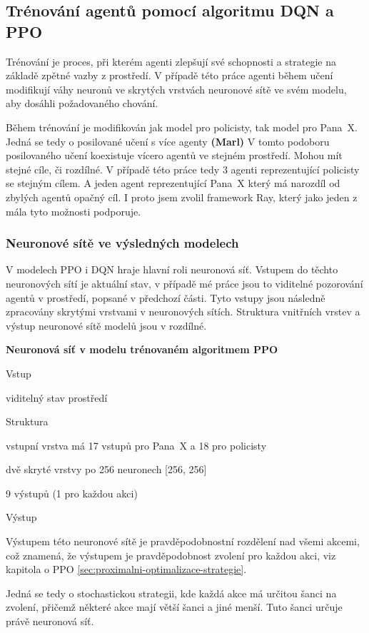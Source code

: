 \subsection{Trénování agentů pomocí algoritmu DQN a PPO}
Trénování je proces, při kterém agenti zlepšují své schopnosti a strategie na základě zpětné vazby z prostředí.
V případě této práce agenti během učení modifikují váhy neuronů ve skrytých vrstvách neuronové sítě ve svém modelu, aby dosáhli požadovaného chování.

Během trénování je modifikován jak model pro policisty, tak model pro Pana~X\@.
Jedná se tedy o posilované učení s více agenty \textbf{(Marl)}
V tomto podoboru posilovaného učení koexistuje vícero agentů ve stejném prostředí.
Mohou mít stejné cíle, či rozdílné.
V případě této práce tedy 3 agenti reprezentující policisty se stejným cílem.
A jeden agent reprezentující Pana~X který má narozdíl od zbylých agentů opačný cíl.
I proto jsem zvolil framework Ray, který jako jeden z mála tyto možnosti podporuje.

\subsubsection{Neuronové sítě ve výsledných modelech}
V modelech PPO i DQN hraje hlavní roli neuronová síť.
Vstupem do těchto neuronových sítí je aktuální stav, v případě mé práce jsou to viditelné pozorování agentů v prostředí, popsané v předchozí části.
Tyto vstupy jsou následně zpracovány skrytými vrstvami v neuronových sítích.
Struktura vnitřních vrstev a výstup neuronové sítě modelů jsou v rozdílné.
\bigskip

  \textbf{Neuronová síť v modelu trénovaném algoritmem PPO}
    \begin{myitemize}
      \item Vstup
        \begin{myitemize}
          \item viditelný stav prostředí
        \end{myitemize}
      \item Struktura
        \begin{myitemize}
          \item vstupní vrstva má 17 vstupů pro Pana~X a 18 pro policisty
          \item dvě skryté vrstvy po 256 neuronech [256, 256]
          \item 9 výstupů (1 pro každou akci)
        \end{myitemize}
      \item Výstup
        \begin{myitemize}
          \item Výstupem této neuronové sítě je pravděpodobnostní rozdělení nad všemi akcemi, což znamená, že výstupem je pravděpodobnost zvolení pro každou akci, viz kapitola o PPO \ref{sec:proximalni-optimalizace-strategie}.
          \item Jedná se tedy o stochastickou strategii, kde každá akce má určitou šanci na zvolení, přičemž některé akce mají větší šanci a jiné menší.
          Tuto šanci určuje právě neuronová síť.
        \end{myitemize}
    \end{myitemize}

